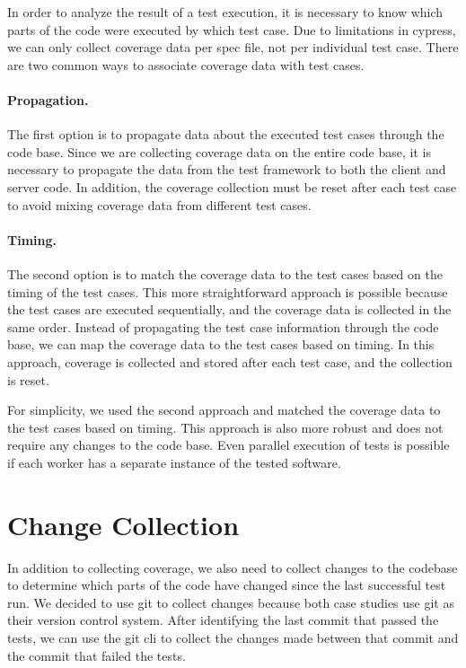 In order to analyze the result of a test execution, it is necessary to know which parts of the code were executed by which test case.
Due to limitations in cypress, we can only collect coverage data per spec file, not per individual test case.
There are two common ways to associate coverage data with test cases.

\paragraph{Propagation.} The first option is to propagate data about the executed test cases through the code base.
Since we are collecting coverage data on the entire code base, it is necessary to propagate the data from the test framework to both the client and server code.
In addition, the coverage collection must be reset after each test case to avoid mixing coverage data from different test cases.

\paragraph{Timing.} The second option is to match the coverage data to the test cases based on the timing of the test cases.
This more straightforward approach is possible because the test cases are executed sequentially, and the coverage data is collected in the same order.
Instead of propagating the test case information through the code base, we can map the coverage data to the test cases based on timing.
In this approach, coverage is collected and stored after each test case, and the collection is reset.

For simplicity, we used the second approach and matched the coverage data to the test cases based on timing.
This approach is also more robust and does not require any changes to the code base.
Even parallel execution of tests is possible if each worker has a separate instance of the tested software.
\section{Change Collection}

In addition to collecting coverage, we also need to collect changes to the codebase to determine which parts of the code have changed since the last successful test run.
We decided to use git to collect changes because both case studies use git as their version control system.
After identifying the last commit that passed the tests, we can use the git \ac{cli} to collect the changes made between that commit and the commit that failed the tests.

